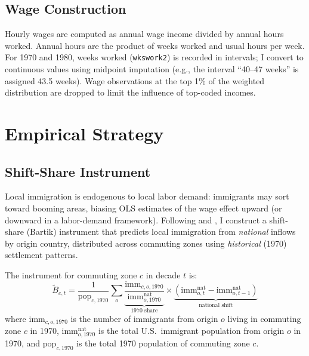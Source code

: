 \documentclass[12pt]{article}
\begin{document}
\subsection{Wage Construction}

Hourly wages are computed as annual wage income divided by annual hours
worked. Annual hours are the product of weeks worked and usual hours per
week. For 1970 and 1980, weeks worked (\texttt{wkswork2}) is recorded in
intervals; I convert to continuous values using midpoint imputation
(e.g., the interval ``40--47 weeks'' is assigned 43.5 weeks). Wage
observations at the top 1\% of the weighted distribution are dropped to
limit the influence of top-coded incomes.

\section{Empirical Strategy}

\subsection{Shift-Share Instrument}

Local immigration is endogenous to local labor demand: immigrants may
sort toward booming areas, biasing OLS estimates of the wage effect
upward (or downward in a labor-demand framework). Following
\citet{card2001immigrant} and \citet{kim2024measuring}, I construct a
shift-share (Bartik) instrument that predicts local immigration from
\emph{national} inflows by origin country, distributed across commuting
zones using \emph{historical} (1970) settlement patterns.

The instrument for commuting zone $c$ in decade $t$ is:
\begin{equation}
    \widetilde{B}_{c,t} = \frac{1}{\text{pop}_{c,1970}}
    \sum_{o} \underbrace{\frac{\text{imm}_{c,o,1970}}
    {\text{imm}^{\text{nat}}_{o,1970}}}_{\text{1970 share}}
    \times
    \underbrace{\left(\text{imm}^{\text{nat}}_{o,t} -
    \text{imm}^{\text{nat}}_{o,t-1}\right)}_{\text{national shift}}
    \label{eq:bartik}
\end{equation}
where $\text{imm}_{c,o,1970}$ is the number of immigrants from origin
$o$ living in commuting zone $c$ in 1970, $\text{imm}^{\text{nat}}_{o,1970}$
is the total U.S.\ immigrant population from origin $o$ in 1970, and
$\text{pop}_{c,1970}$ is the total 1970 population of commuting zone
$c$.
\end{document}
